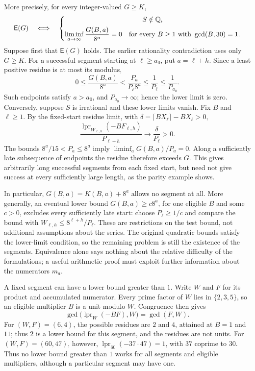 \documentclass[11pt]{article}
\theoremstyle{remark}
\theoremstyle{plain}
\newcommand{\lpr}{\operatorname{lpr}}
\newcommand{\Esc}{\mathsf E}
\begin{document}
More precisely, for every integer-valued $G\ge K$,
\[
 \Esc(G)\quad\Longleftrightarrow\quad
 \left\{\begin{gathered}
 S\notin\Q,\\
 \liminf_{a\to\infty}\frac{G(B,a)}{8^a}=0
 \quad\text{for every }B\ge1\text{ with }\gcd(B,30)=1.
 \end{gathered}\right.
\]
Suppose first that $\Esc(G)$
holds.  The earlier rationality contradiction uses only $G\ge K$.
For a successful segment starting at $\ell\ge a_0$, put $a=\ell+h$.
Since a least positive residue is at most its modulus,
\[
 0\le\frac{G(B,a)}{8^a}
 <\frac{P_a}{P_\ell8^a}\le\frac1{P_\ell}
 \le\frac1{P_{a_0}}.
\]
Such endpoints satisfy $a>a_0$, and $P_{a_0}\to\infty$; hence the
lower limit is zero.  Conversely, suppose $S$ is irrational and these
lower limits vanish.  Fix $B$ and $\ell\ge1$.  By the fixed-start
residue limit, with $\delta=\lceil BX_\ell\rceil-BX_\ell>0$,
\[
 \frac{\lpr_{W_{\ell,h}}(-BF_{\ell,h})}{P_{\ell+h}}
 \longrightarrow\frac{\delta}{P_\ell}>0.
\]
The bounds $8^a/15<P_a\le8^a$ imply
$\liminf_a G(B,a)/P_a=0$.  Along a sufficiently late subsequence of
endpoints the residue therefore exceeds $G$.  This gives arbitrarily
long successful segments from each fixed start, but need not give
success at every sufficiently large length, as the parity example shows.

In particular, $G(B,a)=K(B,a)+8^a$ allows no segment at all.  More
generally, an eventual lower bound $G(B,a)\ge c8^a$, for one eligible
$B$ and some $c>0$, excludes every sufficiently late start: choose
$P_\ell\ge1/c$ and compare the bound with $W_{\ell,h}\le8^{\ell+h}/P_\ell$.
These are restrictions on the test bound, not additional assumptions
about the series.  The original quadratic bounds satisfy the lower-limit
condition, so the remaining problem is still the existence of the
segments.  Equivalence alone says nothing about the relative difficulty
of the formulations; a useful arithmetic proof must exploit further
information about the numerators $m_a$.

A fixed segment can have a lower bound greater than $1$.  Write $W$ and
$F$ for its product and accumulated numerator.  Every prime factor of
$W$ lies in $\{2,3,5\}$, so an eligible multiplier $B$ is a unit modulo
$W$.  Congruence then gives
\[
 \gcd\bigl(\lpr_W(-BF),W\bigr)=\gcd(F,W).
\]
For $(W,F)=(6,4)$, the possible residues are $2$ and $4$, attained at
$B=1$ and $11$; thus $2$ is a lower bound for this segment, and the residues
are not units.  For $(W,F)=(60,47)$, however,
$\lpr_{60}(-37\cdot47)=1$, with $37$ coprime to $30$.
Thus no lower bound greater than $1$ works for all segments and eligible
multipliers, although a particular segment may have one.
\end{document}

